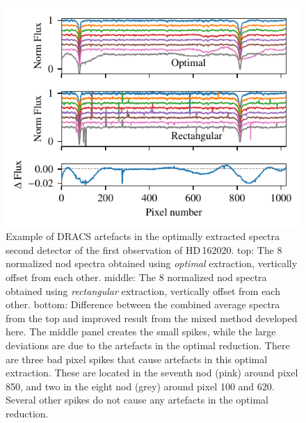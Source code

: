 \begin{figure}
    \centering
    \includegraphics[width=0.75\linewidth]{figures/reduction/bp_plots/extraction_comparision_HD162020-1_chip_2.pdf}
    \caption[Example of {DRACS} artefacts in the optimally extracted spectra {HD\,162020}.]{Example of {DRACS} artefacts in the optimally extracted spectra second detector of the first observation of {HD\,162020}.
        top: The 8 normalized nod spectra obtained using \emph{optimal} extraction, vertically offset from each other.
        middle: The 8 normalized nod spectra obtained using \emph{rectangular} extraction, vertically offset from each other.
        bottom: Difference between the combined average spectra from the top and improved result from the mixed method developed here.
        The middle panel creates the small spikes, while the large deviations are due to the artefacts in the optimal reduction.
        There are three bad pixel spikes that cause artefacts in this optimal extraction.
        These are located in the seventh nod (pink) around pixel 850, and two in the eight nod (grey) around pixel 100 and 620.
        Several other spikes do not cause any artefacts in the optimal reduction.}
    \label{fig:artefact_example_hd162020}
\end{figure}


